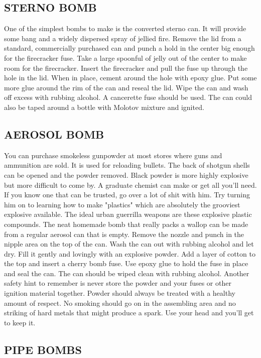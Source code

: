 \documentclass[11pt,twoside,a4paper]{book}
\begin{document}
\subsection{STERNO BOMB}

	One of the simplest bombs to make is the converted sterno can. It will provide some bang and a widely dispersed spray of jellied fire. Remove the lid from a standard, commercially purchased can and punch a hold in the center big enough for the firecracker fuse. Take a large spoonful of jelly out of the center to make room for the firecracker. Insert the firecracker and pull the fuse up through the hole in the lid. When in place, cement around the hole with epoxy glue. Put some more glue around the rim of the can and reseal the lid. Wipe the can and wash off excess with rubbing alcohol. A cancerette fuse should be used. The can could also be taped around a bottle with Molotov mixture and ignited.

\subsection{AEROSOL BOMB}

	You can purchase smokeless gunpowder at most stores where guns and ammunition are sold. It is used for reloading bullets. The back of shotgun shells can be opened and the powder removed. Black powder is more highly explosive but more difficult to come by. A graduate chemist can make or get all you'll need. If you know one that can be trusted, go over a lot of shit with him. Try turning him on to learning how to make "plastics" which are absolutely the grooviest explosive available. The ideal urban guerrilla weapons are these explosive plastic compounds. The neat homemade bomb that really packs a wallop can be made from a regular aerosol can that is empty. Remove the nozzle and punch in the nipple area on the top of the can. Wash the can out with rubbing alcohol and let dry. Fill it gently and lovingly with an explosive powder. Add a layer of cotton to the top and insert a cherry bomb fuse. Use epoxy glue to hold the fuse in place and seal the can. The can should be wiped clean with rubbing alcohol. Another safety hint to remember is never store the powder and your fuses or other ignition material together. Powder should always be treated with a healthy amount of respect. No smoking should go on in the assembling area and no striking of hard metals that might produce a spark. Use your head and you'll get to keep it.

\subsection{PIPE BOMBS}
\end{document}
